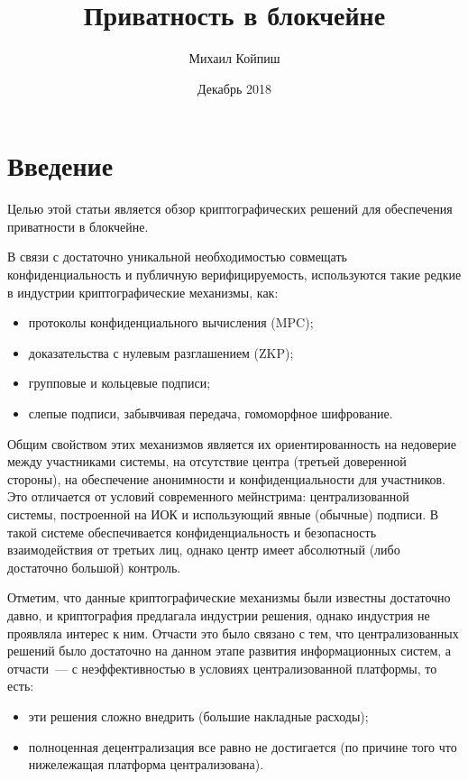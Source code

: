 \documentclass{article}
\title{Приватность в блокчейне}
\author{Михаил Койпиш }
\date{Декабрь 2018}
\begin{document}
\maketitle

\section{Введение}

Целью этой статьи является обзор криптографических решений для обеспечения приватности в блокчейне.

В связи с достаточно уникальной необходимостью совмещать конфиденциальность и публичную верифицируемость,
используются такие редкие в индустрии криптографические механизмы, как:
\begin{itemize}
  \item
  протоколы конфиденциального вычисления (MPC);
  \item
  доказательства с нулевым разглашением (ZKP);
  \item
  групповые и кольцевые подписи;
  \item
  слепые подписи, забывчивая передача, гомоморфное шифрование.

\end{itemize}


 Общим свойством этих механизмов является их ориентированность на недоверие между участниками системы,
  на отсутствие центра (третьей доверенной стороны),
  на обеспечение анонимности и конфиденциальности для участников.
  Это отличается от условий современного мейнстрима:
централизованной системы,
построенной на  ИОК и использующий явные (обычные) подписи.
 В такой системе обеспечивается конфиденциальность и безопасность взаимодействия от третьих лиц,
 однако центр имеет абсолютный (либо достаточно большой) контроль.

 Отметим, что данные криптографические механизмы были известны достаточно давно,
 и криптография предлагала индустрии решения,
 однако индустрия не проявляла интерес к ним.
 Отчасти это было связано с тем,
 что централизованных решений было достаточно на данном этапе развития информационных систем,
  а отчасти~--- с неэффективностью в условиях централизованной платформы,
  то есть:
  \begin{itemize}
    \item
    эти решения сложно внедрить (большие накладные расходы);
    \item
    полноценная децентрализация все равно не достигается
    (по причине того что нижележащая платформа централизована).
  \end{itemize}
\end{document}
